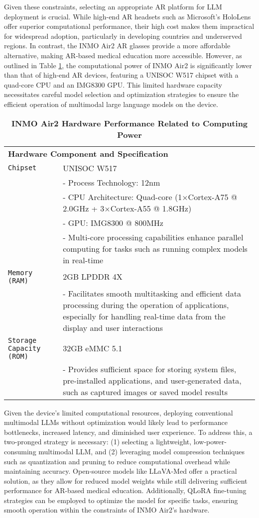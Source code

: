 \documentclass[10pt,letterpaper]{article}
\newlength\savedwidth
\newcommand\thickhline{\noalign{\global\savedwidth\arrayrulewidth\global\arrayrulewidth 2pt}%
\hline
\noalign{\global\arrayrulewidth\savedwidth}}
\begin{document}
Given these constraints, selecting an appropriate AR platform for LLM deployment is crucial. While high-end AR headsets such as Microsoft's HoloLens offer superior computational performance, their high cost makes them impractical for widespread adoption, particularly in developing countries and underserved regions. In contrast, the INMO Air2 AR glasses provide a more affordable alternative, making AR-based medical education more accessible. However, as outlined in Table \ref{tab:INMO_Air2_hardware}, the computational power of INMO Air2 is significantly lower than that of high-end AR devices, featuring a UNISOC W517 chipset with a quad-core CPU and an IMG8300 GPU. This limited hardware capacity necessitates careful model selection and optimization strategies to ensure the efficient operation of multimodal large language models on the device.

\begin{table}[h]
\centering
\caption{\bf INMO Air2 Hardware Performance Related to Computing Power}
\begin{tabular}{p{2cm}|p{8cm}}
\hline
\multicolumn{2}{l}{\bf Hardware Component and Specification}\\ \thickhline
\texttt{Chipset} & UNISOC W517 \\
& - Process Technology: 12nm \\
& - CPU Architecture: Quad-core (1×Cortex-A75 @ 2.0GHz + 3×Cortex-A55 @ 1.8GHz) \\
& - GPU: IMG8300 @ 800MHz \\
& - Multi-core processing capabilities enhance parallel computing for tasks such as running complex models in real-time \\ \hline
\texttt{Memory (RAM)} & 2GB LPDDR 4X \\
& - Facilitates smooth multitasking and efficient data processing during the operation of applications, especially for handling real-time data from the display and user interactions \\ \hline
\texttt{Storage Capacity (ROM)} & 32GB eMMC 5.1 \\
& - Provides sufficient space for storing system files, pre-installed applications, and user-generated data, such as captured images or saved model results \\ \hline
\end{tabular}
\label{tab:INMO_Air2_hardware}
\end{table}

Given the device's limited computational resources, deploying conventional multimodal LLMs without optimization would likely lead to performance bottlenecks, increased latency, and diminished user experience. To address this, a two-pronged strategy is necessary: (1) selecting a lightweight, low-power-consuming multimodal LLM, and (2) leveraging model compression techniques such as quantization and pruning to reduce computational overhead while maintaining accuracy. Open-source models like LLaVA-Med offer a practical solution, as they allow for reduced model weights while still delivering sufficient performance for AR-based medical education. Additionally, QLoRA fine-tuning strategies can be employed to optimize the model for specific tasks, ensuring smooth operation within the constraints of INMO Air2’s hardware.
\end{document}
